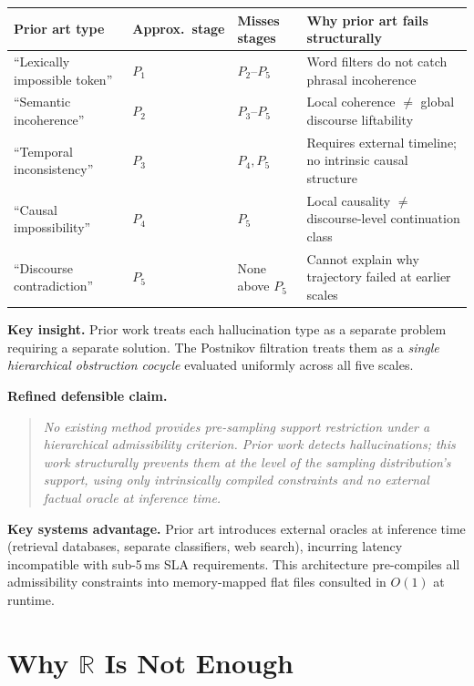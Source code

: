 \documentclass[11pt,a4paper]{article}
\begin{document}
\begin{center}
\renewcommand{\arraystretch}{1.3}\small
\begin{tabular}{p{2.8cm}p{1.8cm}p{2.5cm}p{5.0cm}}
\toprule
\textbf{Prior art type} &
\textbf{Approx.\ stage} &
\textbf{Misses stages} &
\textbf{Why prior art fails structurally} \\
\midrule
``Lexically impossible token'' & $P_1$ & $P_2$--$P_5$ &
  Word filters do not catch phrasal incoherence \\
``Semantic incoherence'' & $P_2$ & $P_3$--$P_5$ &
  Local coherence $\neq$ global discourse liftability \\
``Temporal inconsistency'' & $P_3$ & $P_4, P_5$ &
  Requires external timeline; no intrinsic causal structure \\
``Causal impossibility'' & $P_4$ & $P_5$ &
  Local causality $\neq$ discourse-level continuation class \\
``Discourse contradiction'' & $P_5$ & None above $P_5$ &
  Cannot explain why trajectory failed at earlier scales \\
\bottomrule
\end{tabular}
\end{center}

\noindent\textbf{Key insight.}
Prior work treats each hallucination type as a separate problem
requiring a separate solution.
The Postnikov filtration treats them as a \emph{single hierarchical
obstruction cocycle} evaluated uniformly across all five scales.

\medskip\noindent\textbf{Refined defensible claim.}
\begin{quote}
\emph{No existing method provides pre-sampling support restriction
under a hierarchical admissibility criterion.
Prior work detects hallucinations; this work structurally prevents
them at the level of the sampling distribution's support, using only
intrinsically compiled constraints and no external factual oracle
at inference time.}
\end{quote}

\medskip\noindent\textbf{Key systems advantage.}
Prior art introduces external oracles at inference time
(retrieval databases, separate classifiers, web search),
incurring latency incompatible with sub-5\,ms SLA requirements.
This architecture pre-compiles all admissibility constraints into
memory-mapped flat files consulted in $O(1)$ at runtime.

\section{Why $\mathbb{R}$ Is Not Enough}
\label{sec:why_r}
\end{document}
